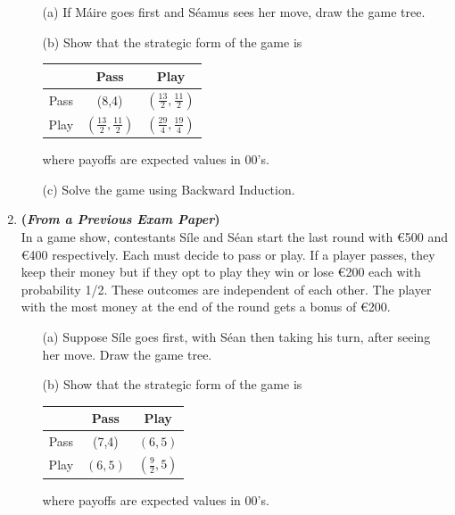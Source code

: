 \documentclass[]{report}
\begin{document}
\begin{enumerate}
\begin{enumerate}
	\item[(a)] If M\'{a}ire goes first and S\'{e}amus sees her move, draw the game tree. 
	\item[(b)] Show that the strategic form of the game is
	
	\begin{center}
		
		\begin{tabular}{|c|c|c|}
			\hline
			& Pass         &Play       \\
			\hline
			Pass & (8,4) &$\left(\frac{13}{2}, \frac{11}{2}\right)$  \\
			\hline
			Play & $\left(\frac{13}{2}, \frac{11}{2}\right)$& $\left(\frac{29}{4}, \frac{19}{4}\right)$ \\
			\hline
		\end{tabular}
	\end{center}
	where payoffs are expected values in 00's. 
	
	\item[(c)] Solve the game using Backward Induction.
\end{enumerate}

\item \textbf{(\textit{From a Previous Exam Paper})} \\ In a game show, contestants S\'{i}le and S\'{e}an start the last round with \euro{500} and \euro{400} respectively. Each must decide to pass or play. If a player passes, they keep their money but if they opt to play they win or lose \euro{200} each with probability 1/2. These outcomes are independent of each other. The player with the most money at the end of the round gets a bonus of \euro{200}.

\begin{enumerate}
	\item[(a)] Suppose S\'{i}le goes first, with S\'{e}an then taking his turn, after seeing her move. Draw the game tree. 
	\item[(b)] Show that the strategic form of the game is
	
	\begin{center}
		
		\begin{tabular}{|c|c|c|}
			\hline
			& Pass         &Play       \\
			\hline
			Pass & (7,4) &$\left(6, 5 \right)$  \\
			\hline
			Play & $\left(6, 5 \right)$ & $\left(\frac{9}{2}, 5\right)$ \\
			\hline
		\end{tabular}
	\end{center}
	where payoffs are expected values in 00's. 
	

\end{enumerate}
\end{enumerate}
\end{document}
